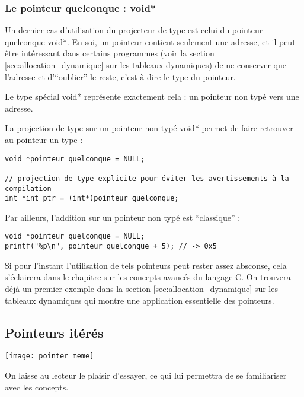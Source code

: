 \documentclass[../../../main.tex]{subfiles}
\begin{document}
\subsubsection{Le pointeur quelconque : \textsf{void*}}
\label{ssub:le_pointeur_quelconque_void_}
Un dernier cas d'utilisation du projecteur de type est celui du pointeur quelconque \textsf{void*}. En soi, un pointeur contient seulement une adresse, et il peut être intéressant dans certains programmes (voir la section \ref{sec:allocation_dynamique} sur les tableaux dynamiques) de ne conserver que l'adresse et d'``oublier'' le reste, c'est-à-dire le type du pointeur.
 
Le type spécial \textsf{void*} représente exactement cela : un pointeur non typé vers une adresse.
 
La projection de type sur un pointeur non typé \textsf{void*} permet de faire retrouver au pointeur un type :
\begin{verbatim}
void *pointeur_quelconque = NULL;

// projection de type explicite pour éviter les avertissements à la compilation
int *int_ptr = (int*)pointeur_quelconque; 
\end{verbatim}
Par ailleurs, l'addition sur un pointeur non typé est ``classique'' :
\begin{verbatim}
void *pointeur_quelconque = NULL;
printf("%p\n", pointeur_quelconque + 5); // -> 0x5
\end{verbatim}
Si pour l'instant l'utilisation de tels pointeurs peut rester assez absconse, cela s'éclairera dans le chapitre sur les concepts avancés du langage C. On trouvera déjà un premier exemple dans la section \ref{sec:allocation_dynamique} sur les tableaux dynamiques qui montre une application essentielle des pointeurs.
\subsection{Pointeurs itérés}
\label{sub:pointeurs_it_r_s}
\begin{minipage}{\textwidth}
	\begin{center}
		\texttt{[image: pointer\_meme]}
	\end{center}
\end{minipage}

On laisse au lecteur le plaisir d'essayer, ce qui lui permettra de se familiariser avec les concepts.
\end{document}
